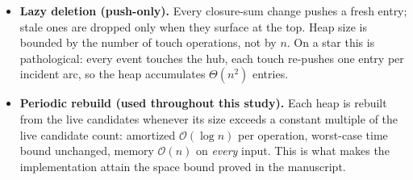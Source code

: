 \documentclass[11pt]{article}
\begin{document}
\begin{itemize}
  \item \textbf{Lazy deletion (push-only).} Every closure-sum change pushes a
  fresh entry; stale ones are dropped only when they surface at the top. Heap
  size is bounded by the number of touch operations, not by $n$. On a star this
  is pathological: every event touches the hub, each touch re-pushes one entry
  per incident arc, so the heap accumulates $\Theta(n^2)$ entries.
  \item \textbf{Periodic rebuild (used throughout this study).} Each heap is
  rebuilt from the live candidates whenever its size exceeds a constant
  multiple of the live candidate count: amortized $\mathcal O(\log n)$ per
  operation, worst-case time bound unchanged, memory $\mathcal O(n)$ on
  \emph{every} input. This is what makes the implementation attain the space
  bound proved in the manuscript.
\end{itemize}
\end{document}

